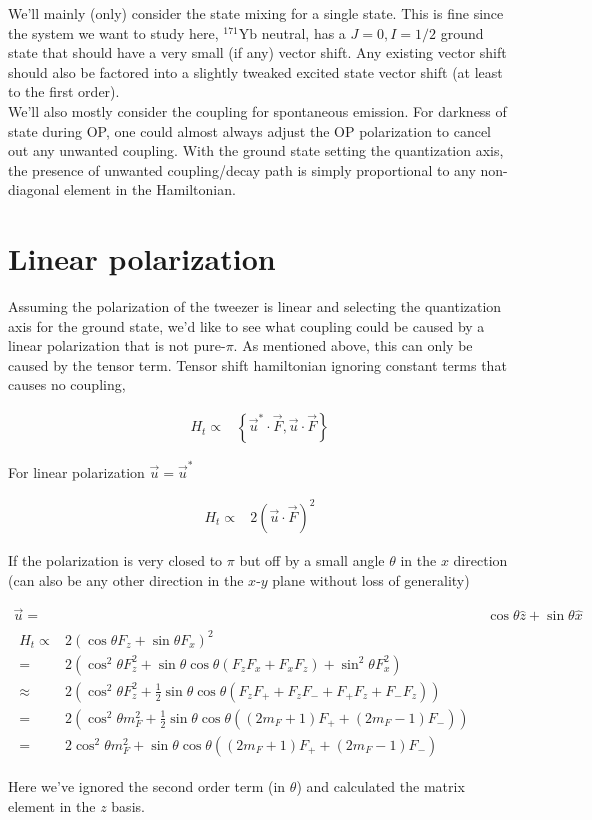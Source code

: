 \documentclass[10pt,fleqn]{article}
\newcommand{\eqar}[1]
{
  \begin{align}
    #1
  \end{align}
}
\newcommand{\paren}[1]{{\left({#1}\right)}}
\newcommand{\crly}[1]{{\left\{{#1}\right\}}}
\begin{document}
We'll mainly (only) consider the state mixing for a single state.
This is fine since the system we want to study here, $^{171}\mathrm{Yb}$ neutral,
has a $J=0, I=1/2$ ground state that should have a very small (if any) vector
shift. Any existing vector shift should also be factored
into a slightly tweaked excited state vector shift (at least to the first order).\\

We'll also mostly consider the coupling for spontaneous emission.
For darkness of state during OP, one could almost always adjust the OP polarization
to cancel out any unwanted coupling. With the ground state
setting the quantization axis, the presence of unwanted coupling/decay path
is simply proportional to any non-diagonal element in the Hamiltonian.\\

\section{Linear polarization}
\label{lin-pol}

Assuming the polarization of the tweezer is linear and selecting the quantization axis
for the ground state, we'd like to see what coupling could be
caused by a linear polarization that is not pure-$\pi$. As mentioned above,
this can only be caused by the tensor term.
Tensor shift hamiltonian ignoring constant terms that causes no coupling,
\eqar{
  H_t\propto&\crly{\vec{u}^*\cdot\vec F,\vec{u}\cdot\vec F}
}

For linear polarization $\vec{u}=\vec{u}^*$
\eqar{
  H_t\propto&2\paren{\vec{u}\cdot\vec F}^2
}

If the polarization is very closed to $\pi$ but off by a small angle $\theta$
in the $x$ direction (can also be any other direction in the $x$-$y$ plane
without loss of generality)
\eqar{
  \vec{u}=&\cos\theta \hat z + \sin\theta \hat x\\
  \begin{split}
    H_t\propto&2\paren{\cos\theta F_z+\sin\theta F_x}^2\\
    =&2\paren{\cos^2\theta F_z^2+\sin\theta\cos\theta\paren{F_zF_x+F_xF_z}+\sin^2\theta F_x^2}\\
    \approx&2\paren{\cos^2\theta F_z^2+\frac{1}{2}\sin\theta\cos\theta\paren{F_zF_++F_zF_-+F_+F_z+F_-F_z}}\\
    =&2\paren{\cos^2\theta m_F^2+\frac{1}{2}\sin\theta\cos\theta\paren{\paren{2m_F+1}F_++\paren{2m_F-1}F_-}}\\
    =&2\cos^2\theta m_F^2+\sin\theta\cos\theta\paren{\paren{2m_F+1}F_++\paren{2m_F-1}F_-}
  \end{split}
}
Here we've ignored the second order term (in $\theta$)
and calculated the matrix element in the $z$ basis.\\
\end{document}

